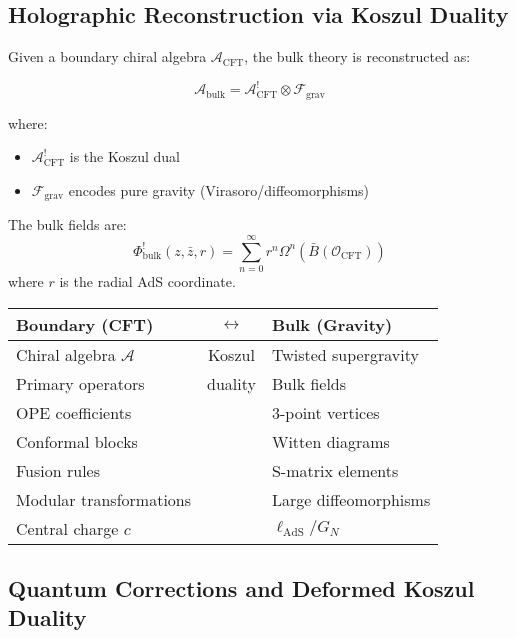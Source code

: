 \subsection{Holographic Reconstruction via Koszul Duality}

\begin{theorem}
Given a boundary chiral algebra $\mathcal{A}_{\text{CFT}}$, the bulk theory is reconstructed as:

$$\mathcal{A}_{\text{bulk}} = \mathcal{A}_{\text{CFT}}^! \otimes \mathcal{F}_{\text{grav}}$$

where:
\begin{itemize}
\item $\mathcal{A}_{\text{CFT}}^!$ is the Koszul dual
\item $\mathcal{F}_{\text{grav}}$ encodes pure gravity (Virasoro/diffeomorphisms)
\end{itemize}

The bulk fields are:
$$\Phi^!_{\text{bulk}}(z, \bar{z}, r) = \sum_{n=0}^\infty r^n \Omega^n(\bar{B}(\mathcal{O}_{\text{CFT}}))$$
where $r$ is the radial AdS coordinate.
\end{theorem}

\begin{corollary}
\begin{center}
\begin{tabular}{|l|c|l|}
\hline
\textbf{Boundary (CFT)} & $\leftrightarrow$ & \textbf{Bulk (Gravity)} \\
\hline
Chiral algebra $\mathcal{A}$ & Koszul & Twisted supergravity \\
Primary operators & duality & Bulk fields \\
OPE coefficients & & 3-point vertices \\
Conformal blocks & & Witten diagrams \\
Fusion rules & & S-matrix elements \\
Modular transformations & & Large diffeomorphisms \\
Central charge $c$ & & $\ell_{\text{AdS}}/G_N$ \\
\hline
\end{tabular}
\end{center}
\end{corollary}

\subsection{Quantum Corrections and Deformed Koszul Duality}

